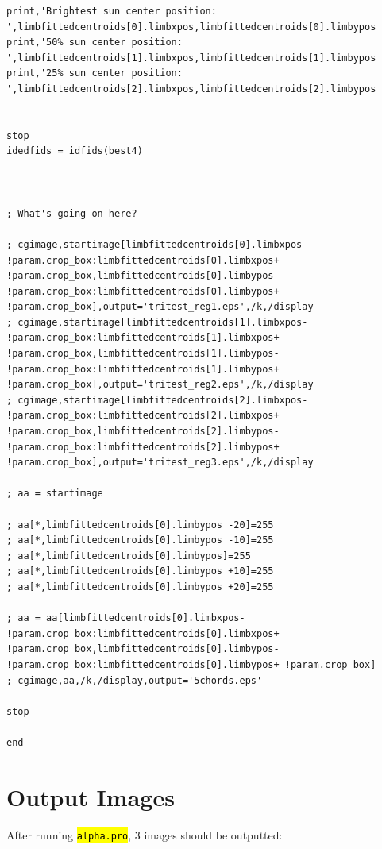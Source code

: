 \documentclass[10pt]{scrartcl}
\newcommand{\code}[1]{\hl{\texttt{#1}}}
\begin{document}
\begin{lstlisting}[texcl=false]
print,'Brightest sun center position: ',limbfittedcentroids[0].limbxpos,limbfittedcentroids[0].limbypos
print,'50% sun center position: ',limbfittedcentroids[1].limbxpos,limbfittedcentroids[1].limbypos
print,'25% sun center position: ',limbfittedcentroids[2].limbxpos,limbfittedcentroids[2].limbypos


stop
idedfids = idfids(best4)



; What's going on here?

; cgimage,startimage[limbfittedcentroids[0].limbxpos- !param.crop_box:limbfittedcentroids[0].limbxpos+ !param.crop_box,limbfittedcentroids[0].limbypos- !param.crop_box:limbfittedcentroids[0].limbypos+ !param.crop_box],output='tritest_reg1.eps',/k,/display
; cgimage,startimage[limbfittedcentroids[1].limbxpos- !param.crop_box:limbfittedcentroids[1].limbxpos+ !param.crop_box,limbfittedcentroids[1].limbypos- !param.crop_box:limbfittedcentroids[1].limbypos+ !param.crop_box],output='tritest_reg2.eps',/k,/display
; cgimage,startimage[limbfittedcentroids[2].limbxpos- !param.crop_box:limbfittedcentroids[2].limbxpos+ !param.crop_box,limbfittedcentroids[2].limbypos- !param.crop_box:limbfittedcentroids[2].limbypos+ !param.crop_box],output='tritest_reg3.eps',/k,/display

; aa = startimage

; aa[*,limbfittedcentroids[0].limbypos -20]=255
; aa[*,limbfittedcentroids[0].limbypos -10]=255
; aa[*,limbfittedcentroids[0].limbypos]=255
; aa[*,limbfittedcentroids[0].limbypos +10]=255
; aa[*,limbfittedcentroids[0].limbypos +20]=255

; aa = aa[limbfittedcentroids[0].limbxpos- !param.crop_box:limbfittedcentroids[0].limbxpos+ !param.crop_box,limbfittedcentroids[0].limbypos- !param.crop_box:limbfittedcentroids[0].limbypos+ !param.crop_box]
; cgimage,aa,/k,/display,output='5chords.eps'

stop

end
\end{lstlisting}


\section{Output Images} %
\label{sec:output_images}

After running \code{alpha.pro}, 3 images should be outputted:
\end{document}
